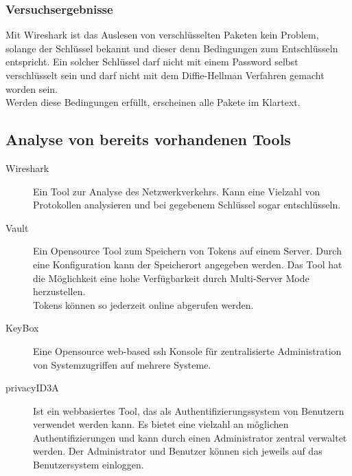 	\subsubsection{Versuchsergebnisse}
	Mit Wireshark ist das Auslesen von verschlüsselten Paketen kein Problem, solange der Schlüssel bekannt und dieser denn Bedingungen zum Entschlüsseln entspricht. Ein solcher Schlüssel darf nicht mit einem Password selbst verschlüsselt sein und darf nicht mit dem Diffie-Hellman Verfahren gemacht worden sein.\\
	Werden diese Bedingungen erfüllt, erscheinen alle Pakete im Klartext. 
	
	\subsection{Analyse von bereits vorhandenen Tools} %
	\begin{description}
		\item[Wireshark] Ein Tool zur Analyse des Netzwerkverkehrs. Kann eine Vielzahl von Protokollen analysieren und bei gegebenem Schlüssel sogar entschlüsseln.
		\item[Vault] Ein Opensource Tool zum Speichern von Tokens auf einem Server. Durch eine Konfiguration kann der Speicherort angegeben werden. Das Tool hat die Möglichkeit eine hohe Verfügbarkeit durch Multi-Server Mode herzustellen.\\
		Tokens können so jederzeit online abgerufen werden.
		\item[KeyBox] Eine Opensource web-based ssh Konsole für zentralisierte Administration von Systemzugriffen auf mehrere Systeme.
		\item[privacyID3A] Ist ein webbasiertes Tool, das als Authentifizierungssystem von Benutzern verwendet werden kann. Es bietet eine vielzahl an möglichen Authentifizierungen und kann durch einen Administrator zentral verwaltet werden. Der Administrator und Benutzer können sich jeweils auf das Benutzersystem einloggen.
	\end{description}